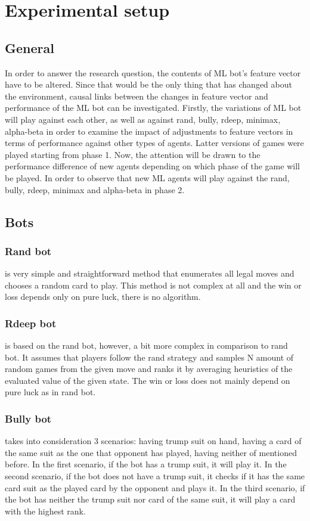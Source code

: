 \documentclass[master]{subfiles}
\begin{document}
\section{Experimental setup}
\subsection{General}
In order to answer the research question, the contents of ML bot’s feature vector have to be altered. Since that would be the only thing that has changed about the environment, causal links between the changes in feature vector and performance of the ML bot can be investigated. Firstly, the variations of ML bot will play against each other, as well as against rand, bully, rdeep, minimax, alpha-beta in order to examine the impact of adjustments to feature vectors in terms of performance against other types of agents. Latter versions of games were played starting from phase 1. Now, the attention will be drawn to the performance difference of new agents depending on which phase of the game will be played. In order to observe that new ML agents will play against the rand, bully, rdeep, minimax and alpha-beta in phase 2.
\subsection{Bots}
\subsubsection{Rand bot}
is very simple and straightforward method that enumerates all legal moves and chooses a random card to play. This method is not complex at all and the win or loss depends only on pure luck, there is no algorithm.
\subsubsection{Rdeep bot}
is based on the rand bot, however, a bit more complex in comparison to rand bot. It assumes that players follow the rand strategy and samples N amount of random games from the given move and ranks it by averaging heuristics of the evaluated value of the given state. The win or loss does not mainly depend on pure luck as in rand bot.
\subsubsection{Bully bot}
takes into consideration 3 scenarios: having trump suit on hand, having a card of the same suit as the one that opponent has played, having neither of mentioned before. In the first scenario, if the bot has a trump suit, it will play it. In the second scenario, if the bot does not have a trump suit, it checks if it has the same card suit as the played card by the opponent and plays it. In the third scenario, if the bot has neither the trump suit nor card of the same suit, it will play a card with the highest rank.
\end{document}
